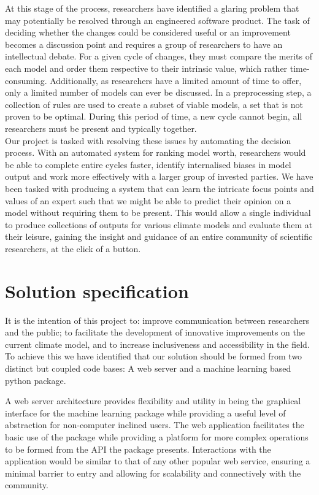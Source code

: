 \documentclass{ecmm427_assignment}
\begin{document}
\quad At this stage of the process, researchers have identified a glaring problem that may potentially be resolved through an engineered software product. The task of deciding whether the changes could be considered useful or an improvement becomes a discussion point and requires a group of researchers to have an intellectual debate. For a given cycle of changes, they must compare the merits of each model and order them respective to their intrinsic value, which rather time-consuming. Additionally, as researchers have a limited amount of time to offer, only a limited number of models can ever be discussed. In a preprocessing step, a collection of rules are used to create a subset of viable models, a set that is not proven to be optimal. During this period of time, a new cycle cannot begin, all researchers must be present and typically together.\\

\quad Our project is tasked with resolving these issues by automating the decision process. With an automated system for ranking model worth, researchers would be able to complete entire cycles faster, identify internalised biases in model output and work more effectively with a larger group of invested parties. We have been tasked with producing a system that can learn the intricate focus points and values of an expert such that we might be able to predict their opinion on a model without requiring them to be present. This would allow a single individual to produce collections of outputs for various climate models and evaluate them at their leisure, gaining the insight and guidance of an entire community of scientific researchers, at the click of a button.

\section{Solution specification}

\quad It is the intention of this project to: improve communication between researchers and the public; to facilitate the development of innovative improvements on the current climate model, and to increase inclusiveness and accessibility in the field. To achieve this we have identified that our solution should be formed from two distinct but coupled code bases: A web server and a machine learning based python package.

\quad A web server architecture provides flexibility and utility in being the graphical interface for the machine learning package while providing a useful level of abstraction for non-computer inclined users. The web application facilitates the basic use of the package while providing a platform for more complex operations to be formed from the API the package presents. Interactions with the application would be similar to that of any other popular web service, ensuring a minimal barrier to entry and allowing for scalability and connectively with the community.\\
\end{document}
